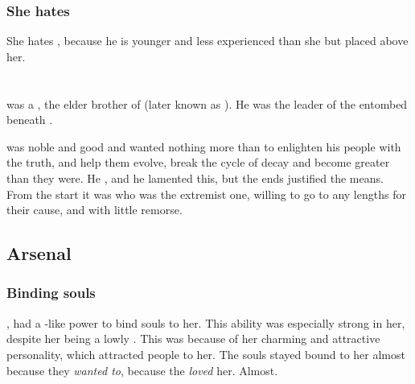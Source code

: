 \subsubsection{She hates \Teshrial}
She hates \Teshrial, because he is younger and less experienced than she but placed above her.















\section{\Damiarch}
\index{\Damiarch}
\Damiarch{} was a \resphan, the elder brother of \Gevural{} (later known as \Azraid). 
He was the leader of the  entombed beneath \Merkyrah. 

\Damiarch{} was noble and good and wanted nothing more than to enlighten his people with the truth, and help them evolve, break the cycle of decay and become greater than they were. 
He , and he lamented this, but the ends justified the means. 
From the start it was \Gevural{} who was the extremist one, willing to go to any lengths for their cause, and with little remorse. 









\subsection{Arsenal}





\subsubsection{Binding souls}
, \Eryal{} had a \sephirah-like power to bind souls to her. 
This ability was especially strong in her, despite her being a lowly \thelyad. 
This was because of her charming and attractive personality, which attracted people to her. 
The souls stayed bound to her almost because they \emph{wanted to}, because the \emph{loved} her. 
Almost. 

